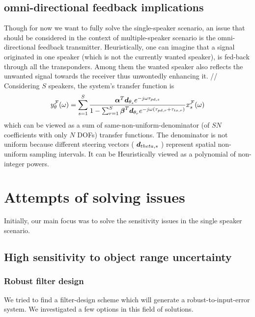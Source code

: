 \documentclass[12pt]{article}
\begin{document}
\subsection*{omni-directional feedback implications}

Though for now we want to fully solve the single-speaker scenario, an issue that should be considered in the context of multiple-speaker scenario is the omni-directional feedback transmitter. Heuristically, one can imagine that a signal originated in one speaker (which is not the currently wanted speaker), is fed-back through all the transponders. Among them the wanted speaker also reflects the unwanted signal towards the receiver thus unwontedly enhancing it.
//
Considering $ S $ speakers, the system's transfer function is 
$$
y_{\theta}^{\mathcal{F}}(\omega) 
=
\sum_{s=1}^{S}
{
\frac
{
\boldsymbol{\alpha}^{T}
\boldsymbol{d}_{\theta_{s}}
e^{-j\omega\tau_{pd,s}}
}
{
1
-
\sum_{r=1}^{S}
{
\boldsymbol{\beta}^{T}\boldsymbol{d}_{\theta_{r}}
e^{-j\omega (\tau_{pd,r}+\tau_{tx,r})}
}
}
x_{s}^{\mathcal{F}}(\omega)
}
$$ 
which can be viewed as a sum of same-non-uniform-denominator (of $ SN $ coefficients with only $ N $ DOFs) transfer functions. The denominator is not uniform because different steering vectors ( $ \boldsymbol{d}_{theta,s} $ ) represent spatial non-uniform sampling intervals. It can be Heuristically viewed as a polynomial of non-integer powers.  

\section*{Attempts of solving issues}

Initially, our main focus was to solve the sensitivity issues in the single speaker scenario. 

\subsection*{High sensitivity to object range uncertainty}

\subsubsection*{Robust filter design}

We tried to find a filter-design scheme which will generate a robust-to-input-error system. We investigated a few options in this field of solutions.
\end{document}
